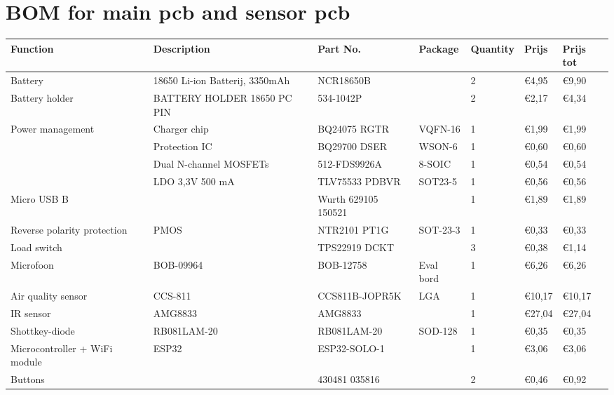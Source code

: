 \documentclass[11pt,a4paper]{article}
\begin{document}
\section{BOM for main pcb and sensor pcb}\label{app:BOM}
    \begin{longtable}{|p{}|p{}||p{}|p{}||p{}|p{}||p{}|} %
    \hline
        Function & Description & Part No. & Package & Quantity & Prijs & Prijs tot \\ \hline
        Battery & 18650 Li-ion Batterij, 3350mAh & NCR18650B &  & 2 & \euro 4,95 & \euro 9,90 \\ \hline
        Battery holder & BATTERY HOLDER 18650 PC PIN & 534-1042P &  & 2 & \euro 2,17 & \euro 4,34 \\ \hline
        Power management & Charger chip & BQ24075 RGTR & VQFN-16 & 1 & \euro 1,99 & \euro 1,99 \\ \hline
         & Protection IC & BQ29700 DSER & WSON-6 & 1 & \euro 0,60 & \euro 0,60 \\ \hline
         & Dual N-channel MOSFETs & 512-FDS9926A & 8-SOIC & 1 & \euro 0,54 & \euro 0,54 \\ \hline
         & LDO 3,3V 500 mA & TLV75533 PDBVR & SOT23-5 & 1 & \euro 0,56 & \euro 0,56 \\ \hline
        Micro USB  B &  & Wurth 629105 150521 &  & 1 & \euro 1,89 & \euro 1,89 \\ \hline
        Reverse polarity protection & PMOS & NTR2101 PT1G & SOT-23-3 & 1 & \euro 0,33 & \euro 0,33 \\ \hline
        Load switch &  & TPS22919 DCKT &  & 3 & \euro 0,38 & \euro 1,14 \\ \hline
        Microfoon & BOB-09964  & BOB-12758 & Eval bord & 1 & \euro 6,26 & \euro 6,26 \\ \hline
        Air quality sensor  & CCS-811 & CCS811B-JOPR5K & LGA & 1 & \euro 10,17 & \euro 10,17 \\ \hline
        IR sensor & AMG8833 & AMG8833  &  & 1 & \euro 27,04 & \euro 27,04 \\ \hline
        Shottkey-diode & RB081LAM-20 & RB081LAM-20 & SOD-128 & 1 & \euro 0,35 & \euro 0,35 \\ \hline
        Microcontroller + WiFi module & ESP32 & ESP32-SOLO-1 &  & 1 & \euro 3,06 & \euro 3,06 \\ \hline
        Buttons &  & 430481 035816 &  & 2 & \euro 0,46 & \euro 0,92 \\ \hline

\end{longtable}
\end{document}
